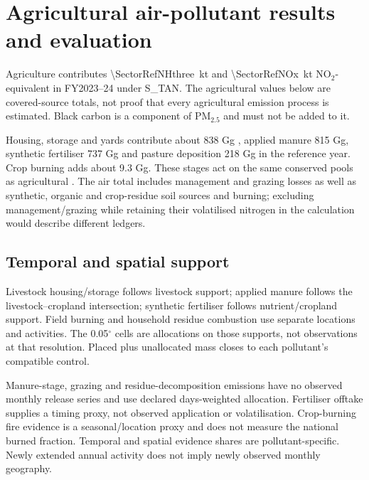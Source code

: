 \section{Agricultural air-pollutant results and evaluation}
\label{sec:airpollutants}
Agriculture contributes \SI{\SectorRefNHthree}{\kilo\tonne} \NHthree{} and \SI{\SectorRefNOx}{\kilo\tonne} NO$_2$-equivalent \NOx{} in FY2023--24 under S\_TAN. The agricultural values below are covered-source totals, not proof that every agricultural emission process is estimated. Black carbon is a component of PM$_{2.5}$ and must not be added to it.

\begin{table}[htbp]\centering\small

\caption{Current agricultural air quantities from the common fiscal release under the TAN-coherent reference. Values by process and pollutant are in \texttt{outputs/air\_\allowbreak pollutants\_\allowbreak 2024.csv}.}\label{tab:apresults}
\end{table}

Housing, storage and yards contribute about 838 Gg \NHthree{}, applied manure 815 Gg, synthetic fertiliser 737 Gg and pasture deposition 218 Gg in the reference year. Crop burning adds about 9.3 Gg. These stages act on the same conserved pools as agricultural \NtwoO{}. The air \NOx{} total includes management and grazing losses as well as synthetic, organic and crop-residue soil sources and burning; excluding management/grazing \NOx{} while retaining their volatilised nitrogen in the \NtwoO{} calculation would describe different ledgers.

\subsection{Temporal and spatial support}\label{sec:ap-spatial}\label{sec:ap-timeseries}\label{sec:ap-crosswalk}
Livestock housing/storage follows livestock support; applied manure follows the livestock--cropland intersection; synthetic fertiliser follows nutrient/cropland support. Field burning and household residue combustion use separate locations and activities. The 0.05$^\circ$ cells are allocations on those supports, not observations at that resolution. Placed plus unallocated mass closes to each pollutant's compatible control.

Manure-stage, grazing and residue-decomposition emissions have no observed monthly release series and use declared days-weighted allocation. Fertiliser offtake supplies a timing proxy, not observed application or volatilisation. Crop-burning fire evidence is a seasonal/location proxy and does not measure the national burned fraction. Temporal and spatial evidence shares are pollutant-specific. Newly extended annual activity does not imply newly observed monthly geography.

